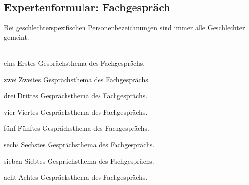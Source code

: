 \documentclass{scrreprt}
\newcommand{\varTitle}{Expertenformular: Fachgespräch}
\begin{document}
\begin{Form}
  \chapter{\varTitle}
  Bei geschlechterspezifischen Personenbezeichnungen sind immer alle Geschlechter gemeint.\\
  \\
  \sbox{}
  \sbox{}
  \sbox{}
  \sbox{}
  \sbox{}
  
  \newpage
  \begin{questionitem}{eins}
    Erstes Gesprächsthema des Fachgesprächs.
  \end{questionitem}
  \begin{questionitem}{zwei}
    Zweites Gesprächsthema des Fachgesprächs.
  \end{questionitem}
  \begin{questionitem}{drei}
    Drittes Gesprächsthema des Fachgesprächs.
  \end{questionitem}
  \begin{questionitem}{vier}
    Viertes Gesprächsthema des Fachgesprächs.
  \end{questionitem}
  \begin{questionitem}{fünf}
    Fünftes Gesprächsthema des Fachgesprächs.
  \end{questionitem}
  \begin{questionitem}{sechs}
    Sechstes Gesprächsthema des Fachgesprächs.
  \end{questionitem}
  \begin{questionitem}{sieben}
    Siebtes Gesprächsthema des Fachgesprächs.
  \end{questionitem}
  \begin{questionitem}{acht}
    Achtes Gesprächsthema des Fachgesprächs.
  \end{questionitem}
\end{Form}
\end{document}
